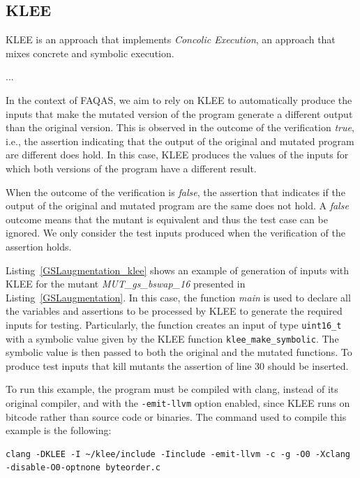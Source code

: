 
\subsection{KLEE}

KLEE is an approach that implements {\em Concolic Execution}, an approach that mixes concrete and symbolic execution.

...

In the context of FAQAS, we aim to rely on KLEE to automatically produce the inputs that make the mutated version of the program generate a different output than the original version.
This is observed in the outcome of the verification \emph{true}, i.e., the assertion indicating that the output of the original and mutated program are different does hold. In this case, KLEE produces the values of the inputs for which both versions of the program have a different result.

When the outcome of the verification is \emph{false}, the assertion that indicates if the output of the original and mutated program are the same does not hold. A \emph{false} outcome means that the mutant is equivalent and thus the test case can be ignored. 
We only consider the test inputs produced when the verification of the assertion holds.



Listing~\ref{GSLaugmentation_klee} shows an example of generation of inputs with KLEE for the mutant \linebreak\emph{MUT\_gs\_bswap\_16} presented in Listing~\ref{GSLaugmentation}. In this case, the function \emph{main} is used to declare all the variables and assertions to be processed by KLEE to generate the required inputs for testing. Particularly, the function creates an input of type \texttt{uint16\_t} with a symbolic value given by the KLEE function \texttt{klee\_make\_symbolic}. The symbolic value is then passed to both the original and the mutated functions. To produce test inputs that kill mutants the assertion of line 30 should be inserted.

To run this example, the program must be compiled with clang, instead of its original compiler, and with the \texttt{-emit-llvm} option enabled, since KLEE runs on bitcode rather than source code or binaries. The command used to compile this example is the following:

\begin{verbatim}
clang -DKLEE -I ~/klee/include -Iinclude -emit-llvm -c -g -O0 -Xclang 
-disable-O0-optnone byteorder.c
\end{verbatim}

